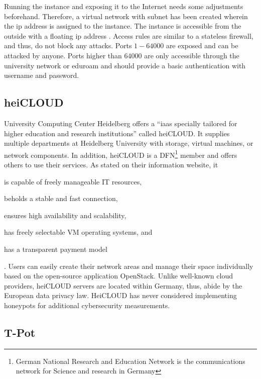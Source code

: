 Running the instance and exposing it to the Internet needs some adjustments beforehand.
Therefore, a virtual network with subnet  has been created wherein the \ac{ip} address  is assigned to the instance.
The instance is accessible from the outside with a floating \ac{ip} address .
Access rules are similar to a stateless firewall, and thus, do not block any attacks.
Ports $1-64000$ are exposed and can be attacked by anyone.
Ports higher than $64000$ are only accessible through the university network  or eduroam  and should provide a basic authentication with username and password.

\subsection{heiCLOUD}
\label{subsec:heicloud}

University Computing Center Heidelberg offers a \enquote{\ac{iaas} specially tailored for higher education and research institutions}\cite{urz2021} called heiCLOUD.
It supplies multiple departments at Heidelberg University with storage, virtual machines, or network components.
In addition, heiCLOUD is a DFN\footnote{German National Research and Education Network is the communications network for Science and research in Germany} member and offers others to use their services.
As stated on their information website\cite{heicloud2021}, it 
\begin{enumerate*}[label=(\roman*)]
    \item is capable of freely manageable IT resources,
    \item beholds a stable and fast connection,
    \item ensures high availability and scalability,
    \item has freely selectable VM operating systems, and
    \item has a transparent payment model
\end{enumerate*} \cite{heicloud2021}.
Users can easily create their network areas and manage their space individually based on the open-source application OpenStack.
Unlike well-known cloud providers, heiCLOUD servers are located within Germany, thus, abide by the European data privacy law.
HeiCLOUD has never considered implementing honeypots for additional cybersecurity measurements.

\subsection{T-Pot}
\label{subsec:tpot}

